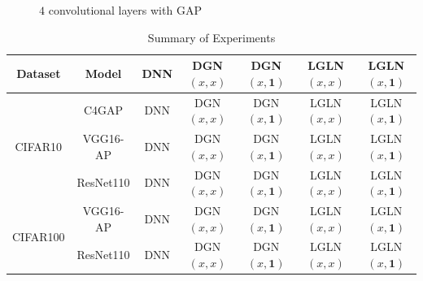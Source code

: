 

\begin{figure}
\centering
\begin{minipage}{1.0\columnwidth}
\centering
\begin{minipage}{0.49\columnwidth}
\resizebox{0.99\columnwidth}{!}{

}
\end{minipage}
\begin{minipage}{0.49\columnwidth}
\resizebox{0.99\columnwidth}{!}{

}
\end{minipage}
\end{minipage}
\caption{$4$ convolutional layers with GAP}
\label{fig:c4gap}
\end{figure}

\begin{table}
\centering
\begin{tabular}{ccccccc}
\toprule 
Dataset & Model & DNN & DGN$(x,x)$ & DGN$(x,\mathbf{1})$ &  LGLN$(x,x)$ & LGLN$(x,\mathbf{1})$\\\midrule
\multirow{3}{*}{CIFAR10}& C4GAP & DNN & DGN$(x,x)$ & DGN$(x,\mathbf{1})$ &  LGLN$(x,x)$ & LGLN$(x,\mathbf{1})$\\
& VGG16-AP & DNN & DGN$(x,x)$ & DGN$(x,\mathbf{1})$ &  LGLN$(x,x)$ & LGLN$(x,\mathbf{1})$\\
&ResNet110 & DNN & DGN$(x,x)$ & DGN$(x,\mathbf{1})$ &  LGLN$(x,x)$ & LGLN$(x,\mathbf{1})$\\\midrule
\multirow{2}{*}{CIFAR100} & VGG16-AP & DNN & DGN$(x,x)$ & DGN$(x,\mathbf{1})$ &  LGLN$(x,x)$ & LGLN$(x,\mathbf{1})$\\
&ResNet110 & DNN & DGN$(x,x)$ & DGN$(x,\mathbf{1})$ &  LGLN$(x,x)$ & LGLN$(x,\mathbf{1})$\\

\bottomrule
\end{tabular}
\caption{Summary of Experiments}
\label{tb:expresults}
\end{table}



